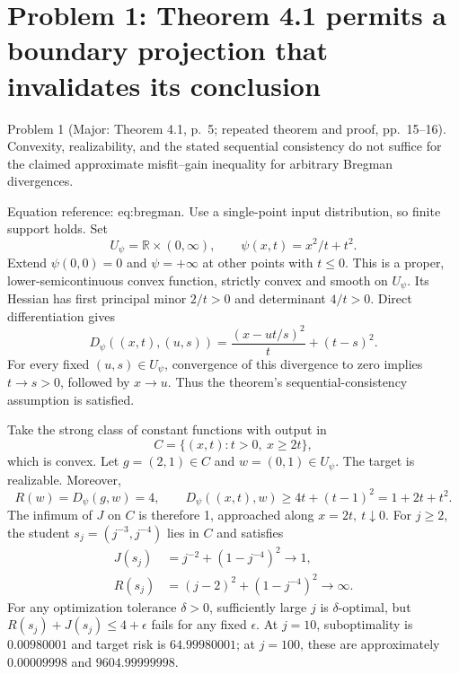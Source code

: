 \documentclass[10pt]{article}
\begin{document}
\section*{Problem 1: Theorem 4.1 permits a boundary projection that invalidates its conclusion}
Problem 1 (Major: Theorem 4.1, p. 5; repeated theorem and proof, pp. 15–16).  Convexity, realizability, and the stated sequential consistency do not suffice for the claimed approximate misfit–gain inequality for arbitrary Bregman divergences.\par
Equation reference: eq:bregman. Use a single-point input distribution, so finite support holds. Set \[U_\psi=\mathbb R\times(0,\infty),\qquad
 \psi(x,t)=x^2/t+t^2.\] Extend \(\psi(0,0)=0\) and \(\psi=+\infty\) at other points with \(t\leq0\). This is a proper, lower-semicontinuous convex function, strictly convex and smooth on \(U_\psi\). Its Hessian has first principal minor \(2/t>0\) and determinant \(4/t>0\). Direct differentiation gives \[D_\psi((x,t),(u,s))
   =\frac{(x-ut/s)^2}{t}+(t-s)^2.
 \] For every fixed \((u,s)\in U_\psi\), convergence of this divergence to zero implies \(t\to s>0\), followed by \(x\to u\). Thus the theorem’s sequential-consistency assumption is satisfied.\par
Take the strong class of constant functions with output in \[C=\{(x,t):t>0,\ x\geq2t\},\] which is convex. Let \(g=(2,1)\in C\) and \(w=(0,1)\in U_\psi\). The target is realizable. Moreover, \[R(w)=D_\psi(g,w)=4,\qquad
 D_\psi((x,t),w)\geq4t+(t-1)^2=1+2t+t^2.\] The infimum of \(J\) on \(C\) is therefore 1, approached along \(x=2t,\ t\downarrow0\). For \(j\geq2\), the student \(s_j=(j^{-3},j^{-4})\) lies in \(C\) and satisfies \[\begin{aligned}
 J(s_j)&=j^{-2}+(1-j^{-4})^2\longrightarrow1,\\
 R(s_j)&=(j-2)^2+(1-j^{-4})^2\longrightarrow\infty.\end{aligned}\] For any optimization tolerance \(\delta>0\), sufficiently large \(j\) is \(\delta\)-optimal, but \(R(s_j)+J(s_j)\leq4+\epsilon\) fails for any fixed \(\epsilon\). At \(j=10\), suboptimality is \(0.00980001\) and target risk is \(64.99980001\); at \(j=100\), these are approximately \(0.00009998\) and \(9604.99999998\).\par
\end{document}
